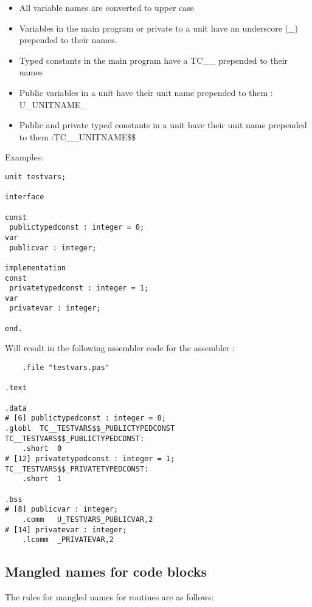 \begin{itemize}
\item All variable names are converted to upper case
\item Variables in the main program or private to a unit have an underscore
(\_) prepended to their names.
\item Typed constants in the main program have a TC\_\_ prepended to their names
\item Public variables in a unit have their unit name prepended to them : U\_UNITNAME\_
\item Public and private typed constants in a unit have their unit name prepended to them :TC\_\_UNITNAME\$\$
\end{itemize}
Examples:
\begin{verbatim}
unit testvars;

interface

const
 publictypedconst : integer = 0;
var
 publicvar : integer;

implementation
const
 privatetypedconst : integer = 1;
var
 privatevar : integer;

end.
\end{verbatim}
Will result in the following assembler code for the \gnu assembler :
\begin{verbatim}
	.file "testvars.pas"

.text

.data
# [6] publictypedconst : integer = 0;
.globl	TC__TESTVARS$$_PUBLICTYPEDCONST
TC__TESTVARS$$_PUBLICTYPEDCONST:
	.short	0
# [12] privatetypedconst : integer = 1;
TC__TESTVARS$$_PRIVATETYPEDCONST:
	.short	1

.bss
# [8] publicvar : integer;
	.comm	U_TESTVARS_PUBLICVAR,2
# [14] privatevar : integer;
	.lcomm	_PRIVATEVAR,2
\end{verbatim}


\subsection{Mangled names for code blocks}

The rules for mangled names for routines are as follows:

